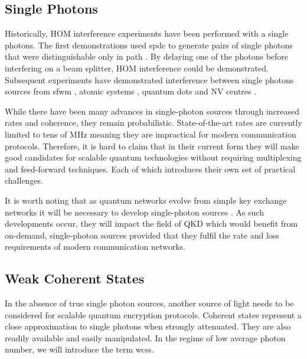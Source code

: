 
\subsection{Single Photons}

Historically, \acl{HOM} interference experiments have been performed with a single photons. The first demonstrations used \ac{spdc} to generate pairs of single photons that were distinguishable only in path \cite{HOM, Rarity1989}. By delaying one of the photons before interfering on a beam splitter, \ac{HOM} interference could be demonstrated. Subsequent experiments have demonstrated interference between single photons sources from \ac{sfwm} \cite{jiang2015}, atomic systems \cite{Leong2015}, quantum dots \cite{somaschi2016} and NV centres \cite{Bernien2012}.


While there have been many advances in single-photon sources through increased rates and coherence, they remain probabilistic. State-of-the-art rates are currently limited to tens of MHz \cite{chen2018} meaning they are impractical for modern communication protocols. Therefore, it is hard to claim that in their current form they will make good candidates for scalable quantum technologies without requiring multiplexing and feed-forward techniques. Each of which introduces their own set of practical challenges. 

It is worth noting that as quantum networks evolve from simple key exchange networks it will be necessary to develop single-photon sources \cite{wehner2018}. As such developments occur, they will impact the field of \ac{QKD} which would benefit from on-demand, single-photon sources provided that they fulfil the rate and loss requirements of modern communication networks. 


\subsection{Weak Coherent States}

In the absence of true single photon sources, another source of light needs to be considered for scalable quantum encryption protocols. Coherent states represent a close approximation to single photons when strongly attenuated. They are also readily available and easily manipulated. In the regime of low average photon number, we will introduce the term \acp{wcs}. 

